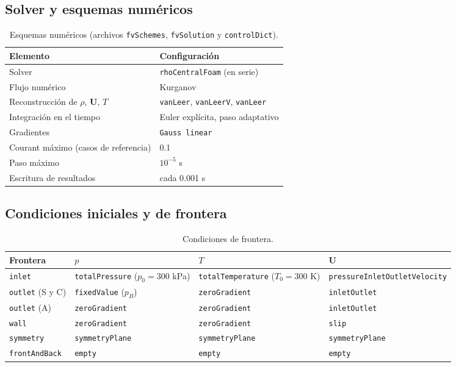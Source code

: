 \documentclass[12pt,letterpaper]{article}
\numberwithin{equation}{section}
\begin{document}
\subsection{Solver y esquemas numéricos}

\begin{table}[H]
\centering
\caption{Esquemas numéricos (archivos \texttt{fvSchemes}, \texttt{fvSolution} y \texttt{controlDict}).}
\label{tab:esquemas}
\renewcommand{\arraystretch}{1.2}
\small
\begin{tabular}{ll}
\toprule
\textbf{Elemento} & \textbf{Configuración} \\
\midrule
Solver & \texttt{rhoCentralFoam} (en serie) \\
Flujo numérico & Kurganov \\
Reconstrucción de $\rho$, $\mathbf U$, $T$ & \texttt{vanLeer}, \texttt{vanLeerV}, \texttt{vanLeer} \\
Integración en el tiempo & Euler explícita, paso adaptativo \\
Gradientes & \texttt{Gauss linear} \\
Courant máximo (casos de referencia) & 0.1 \\
Paso máximo & $10^{-5}$ s \\
Escritura de resultados & cada 0.001 s \\
\bottomrule
\end{tabular}
\end{table}

\subsection{Condiciones iniciales y de frontera}

\begin{table}[H]
\centering
\caption{Condiciones de frontera.}
\label{tab:fronteras}
\renewcommand{\arraystretch}{1.2}
\small
\begin{tabular}{p{2.5cm}p{3.9cm}p{4.1cm}p{4.3cm}}
\toprule
\textbf{Frontera} & $p$ & $T$ & $\mathbf U$ \\
\midrule
\texttt{inlet} & \texttt{total\-Pressure} ($p_0=300$ kPa) & \texttt{total\-Temperature} ($T_0=300$ K) & \texttt{pressure\-Inlet\-Outlet\-Velocity} \\
\texttt{outlet} (S y C) & \texttt{fixedValue} ($p_B$) & \texttt{zeroGradient} & \texttt{inletOutlet} \\
\texttt{outlet} (A) & \texttt{zeroGradient} & \texttt{zeroGradient} & \texttt{inletOutlet} \\
\texttt{wall} & \texttt{zeroGradient} & \texttt{zeroGradient} & \texttt{slip} \\
\texttt{symmetry} & \texttt{symmetryPlane} & \texttt{symmetryPlane} & \texttt{symmetryPlane} \\
\texttt{frontAndBack} & \texttt{empty} & \texttt{empty} & \texttt{empty} \\
\bottomrule
\end{tabular}
\end{table}
\end{document}
